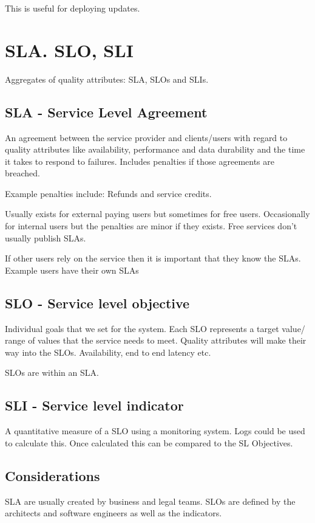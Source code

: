 This is useful for deploying updates.

\section{SLA. SLO, SLI}
Aggregates of quality attributes: SLA, SLOs and SLIs.

\subsection{SLA - Service Level Agreement}
An agreement between the service provider and clients/users with regard to quality attributes like availability, performance and data durability and the time it takes to respond to failures.
Includes penalties if those agreements are breached.

Example penalties include: Refunds and service credits.

Usually exists for external paying users but sometimes for free users.
Occasionally for internal users but the penalties are minor if they exists.
Free services don't usually publish SLAs.

If other users rely on the service then it is important that they know the SLAs.
Example users have their own SLAs

\subsection{SLO - Service level objective}
Individual goals that we set for the system.
Each SLO represents a target value/ range of values that the service needs to meet.
Quality attributes will make their way into the SLOs. Availability, end to end latency etc.

SLOs are within an SLA.

\subsection{SLI - Service level indicator}
A quantitative measure of a SLO using a monitoring system.
Logs could be used to calculate this.
Once calculated this can be compared to the SL Objectives.

\subsection{Considerations}

SLA are usually created by business and legal teams.
SLOs are defined by the architects and software engineers as well as the indicators.


